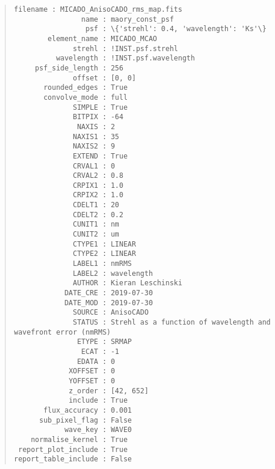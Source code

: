 \begin{quote}
\begin{alltt}
\begin{lstlisting}[frame=single]
            filename : MICADO_AnisoCADO_rms_map.fits
                name : maory_const_psf
                 psf : \{'strehl': 0.4, 'wavelength': 'Ks'\}
        element_name : MICADO_MCAO
              strehl : !INST.psf.strehl
          wavelength : !INST.psf.wavelength
     psf_side_length : 256
              offset : [0, 0]
       rounded_edges : True
       convolve_mode : full
              SIMPLE : True
              BITPIX : -64
               NAXIS : 2
              NAXIS1 : 35
              NAXIS2 : 9
              EXTEND : True
              CRVAL1 : 0
              CRVAL2 : 0.8
              CRPIX1 : 1.0
              CRPIX2 : 1.0
              CDELT1 : 20
              CDELT2 : 0.2
              CUNIT1 : nm
              CUNIT2 : um
              CTYPE1 : LINEAR
              CTYPE2 : LINEAR
              LABEL1 : nmRMS
              LABEL2 : wavelength
              AUTHOR : Kieran Leschinski
            DATE_CRE : 2019-07-30
            DATE_MOD : 2019-07-30
              SOURCE : AnisoCADO
              STATUS : Strehl as a function of wavelength and wavefront error (nmRMS)
               ETYPE : SRMAP
                ECAT : -1
               EDATA : 0
             XOFFSET : 0
             YOFFSET : 0
             z_order : [42, 652]
             include : True
       flux_accuracy : 0.001
      sub_pixel_flag : False
            wave_key : WAVE0
    normalise_kernel : True
 report_plot_include : True
report_table_include : False
\end{lstlisting}
\end{alltt}
\end{quote}
